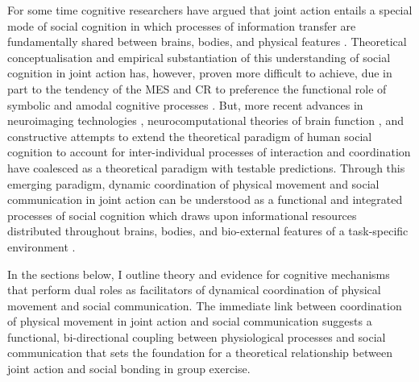 \begin{CJK}{UTF8}{gbsn}
For some time cognitive researchers have argued that joint action entails a special mode of social cognition in which processes of information transfer are fundamentally shared between brains, bodies, and physical features \citep{Hutchins1995,Kirsh2006,Susi2001}.  Theoretical conceptualisation and empirical substantiation of this understanding of social cognition in joint action has, however, proven more difficult to achieve, due in part to the tendency of the MES and CR to preference the functional role of symbolic and amodal cognitive processes \citep{Semin2008,Yufik2013}.
But, more recent advances in neuroimaging technologies \citep{Frith2007}, neurocomputational theories of brain function \citep{Friston2010,Frith2010,Yufik2013,Clark2013}, and constructive attempts to extend the theoretical paradigm of human social cognition to account for inter-individual processes of interaction and coordination \citep[e.g.][]{Sebanz2006,Semin2008,Dale2014} have coalesced as a theoretical paradigm with testable predictions.  Through this emerging paradigm, dynamic coordination of physical movement and social communication in joint action can be understood as a functional and integrated processes of social cognition which draws upon informational resources distributed throughout brains, bodies, and bio-external features of a task-specific environment \citep{Clark2015}.

In the sections below, I outline theory and evidence for cognitive mechanisms that perform dual roles as facilitators of dynamical coordination of physical movement and social communication.  The immediate link between coordination of physical movement in joint action and social communication suggests a functional, bi-directional coupling between physiological processes and social communication that sets the foundation for a theoretical relationship between joint action and social bonding in group exercise.



\end{CJK}
